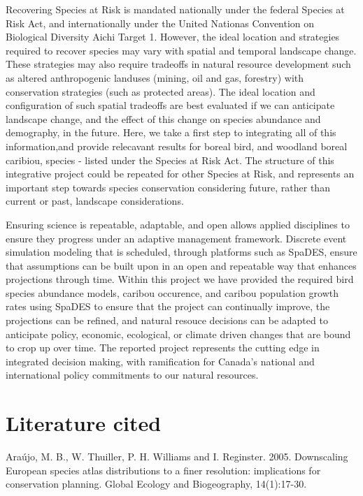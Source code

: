 \documentclass[]{article}
\begin{document}
Recovering Species at Risk is mandated nationally under the federal
Species at Risk Act, and internationally under the United Nationas
Convention on Biological Diversity Aichi Target 1. However, the ideal
location and strategies required to recover species may vary with
spatial and temporal landscape change. These strategies may also require
tradeoffs in natural resource development such as altered anthropogenic
landuses (mining, oil and gas, forestry) with conservation strategies
(such as protected areas). The ideal location and configuration of such
spatial tradeoffs are best evaluated if we can anticipate landscape
change, and the effect of this change on species abundance and
demography, in the future. Here, we take a first step to integrating all
of this information,and provide relecavant results for boreal bird, and
woodland boreal caribiou, species - listed under the Species at Risk
Act. The structure of this integrative project could be repeated for
other Species at Risk, and represents an important step towards species
conservation considering future, rather than current or past, landscape
considerations.

Ensuring science is repeatable, adaptable, and open allows applied
disciplines to ensure they progress under an adaptive management
framework. Discrete event simulation modeling that is scheduled, through
platforms such as SpaDES, ensure that assumptions can be built upon in
an open and repeatable way that enhances projections through time.
Within this project we have provided the required bird species abundance
models, caribou occurence, and caribou population growth rates using
SpaDES to ensure that the project can continually improve, the
projections can be refined, and natural resouce decisions can be adapted
to anticipate policy, economic, ecological, or climate driven changes
that are bound to crop up over time. The reported project represents the
cutting edge in integrated decision making, with ramification for
Canada's national and international policy commitments to our natural
resources.

\section{Literature cited}\label{literature-cited}

Araújo, M. B., W. Thuiller, P. H. Williams and I. Reginster. 2005.
Downscaling European species atlas distributions to a finer resolution:
implications for conservation planning. Global Ecology and Biogeography,
14(1):17-30.
\end{document}
